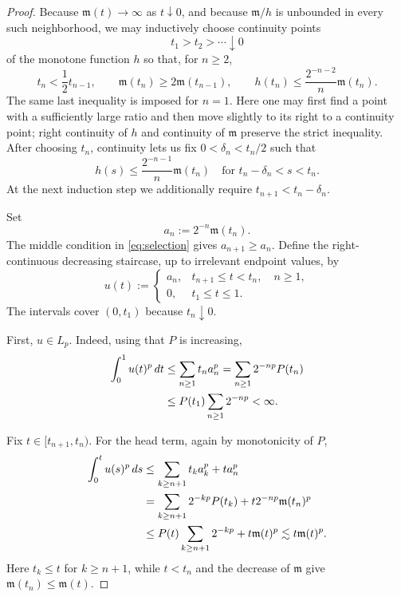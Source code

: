 \documentclass[11pt]{article}
\theoremstyle{definition}
\theoremstyle{remark}
\newcommand{\mfun}{\mathfrak m}
\newcommand{\lesssimc}{\mathrel{\lesssim}}
\begin{document}
\begin{proof}
Because $\mfun(t)\to\infty$ as $t\downarrow0$, and because $\mfun/h$ is
unbounded in every such neighborhood, we may inductively choose continuity
points
\[
  t_1>t_2>\cdots\downarrow0
\]
of the monotone function $h$ so that, for $n\geq2$,
\begin{equation}\label{eq:selection}
  t_n<\frac12t_{n-1},
  \qquad
  \mfun(t_n)\geq2\mfun(t_{n-1}),
  \qquad
  h(t_n)\leq\frac{2^{-n-2}}{n}\mfun(t_n).
\end{equation}
The same last inequality is imposed for $n=1$.  Here one may first find a
point with a sufficiently large ratio and then move slightly to its right to
a continuity point; right continuity of $h$ and continuity of $\mfun$
preserve the strict inequality.  After choosing $t_n$, continuity lets us
fix $0<\delta_n<t_n/2$ such that
\begin{equation}\label{eq:positive-interval}
  h(s)\leq\frac{2^{-n-1}}{n}\mfun(t_n)
  \quad\text{for }t_n-\delta_n<s<t_n.
\end{equation}
At the next induction step we additionally require
$t_{n+1}<t_n-\delta_n$.

Set
\begin{equation}\label{eq:an}
  a_n:=2^{-n}\mfun(t_n).
\end{equation}
The middle condition in \eqref{eq:selection} gives $a_{n+1}\geq a_n$.  Define
the right-continuous decreasing staircase, up to irrelevant endpoint values,
by
\begin{equation}\label{eq:u}
  u(t):=
  \begin{cases}
    a_n,&t_{n+1}\leq t<t_n,\quad n\geq1,\\
    0,&t_1\leq t\leq1.
  \end{cases}
\end{equation}
The intervals cover $(0,t_1)$ because $t_n\downarrow0$.

First, $u\in L_p$.  Indeed, using that $P$ is increasing,
\begin{align}\label{eq:Lp-u}
  \int_0^1u(t)^p\,dt
  &\leq\sum_{n\geq1}t_na_n^p
   =\sum_{n\geq1}2^{-np}P(t_n)\\
  &\leq P(t_1)\sum_{n\geq1}2^{-np}<\infty.\notag
\end{align}

Fix $t\in[t_{n+1},t_n)$.  For the head term, again by monotonicity of $P$,
\begin{align}
  \int_0^t u(s)^p\,ds
  &\leq \sum_{k\geq n+1}t_ka_k^p+t a_n^p\notag\\
  &=\sum_{k\geq n+1}2^{-kp}P(t_k)
    +t2^{-np}\mfun(t_n)^p\notag\\
  &\leq P(t)\sum_{k\geq n+1}2^{-kp}+t\mfun(t)^p
   \lesssimc t\mfun(t)^p.\label{eq:head-u}
\end{align}
Here $t_k\leq t$ for $k\geq n+1$, while $t<t_n$ and the decrease of
$\mfun$ give $\mfun(t_n)\leq\mfun(t)$.


\end{proof}
\end{document}
